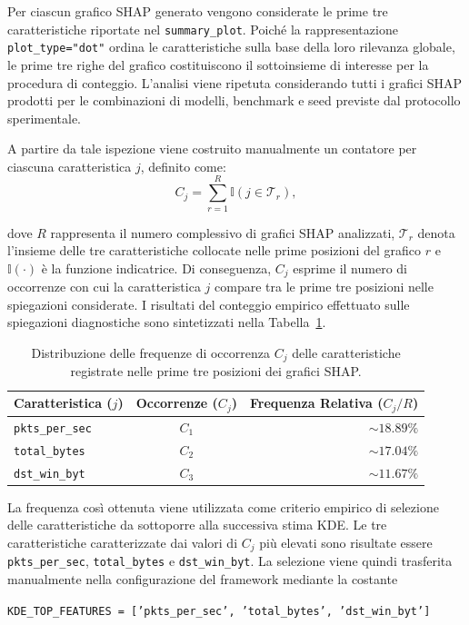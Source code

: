 Per ciascun grafico SHAP generato vengono considerate le prime tre caratteristiche riportate nel \texttt{summary\_plot}. 
Poiché la rappresentazione \texttt{plot\_type="dot"} ordina le caratteristiche sulla base della loro rilevanza globale, le prime tre righe del grafico costituiscono il sottoinsieme di interesse per la procedura di conteggio. 
L'analisi viene ripetuta considerando tutti i grafici SHAP prodotti per le combinazioni di modelli, benchmark e seed previste dal protocollo sperimentale.

A partire da tale ispezione viene costruito manualmente un contatore per ciascuna caratteristica $j$, definito come:
\begin{equation}
C_j =
\sum_{r=1}^{R}
\mathbb{I}\left(j \in \mathcal{T}_r\right),
\label{eq:shap_feature_counter}
\end{equation}

dove $R$ rappresenta il numero complessivo di grafici SHAP analizzati, $\mathcal{T}_r$ denota l'insieme delle tre caratteristiche collocate nelle prime posizioni del grafico $r$ e $\mathbb{I}(\cdot)$ è la funzione indicatrice. 
Di conseguenza, $C_j$ esprime il numero di occorrenze con cui la caratteristica $j$ compare tra le prime tre posizioni nelle spiegazioni considerate.
I risultati del conteggio empirico effettuato sulle spiegazioni diagnostiche sono sintetizzati nella Tabella~\ref{tab:shap_feature_frequencies}. 

\begin{table}[H]
    \centering
    \small
    \caption{Distribuzione delle frequenze di occorrenza $C_j$ delle caratteristiche registrate nelle prime tre posizioni dei grafici SHAP.}
    \label{tab:shap_feature_frequencies}
    \begin{tabular}{l c r}
        \toprule
        \textbf{Caratteristica ($j$)} & \textbf{Occorrenze ($C_j$)} & \textbf{Frequenza Relativa ($C_j / R$)} \\
        \midrule
        \texttt{pkts\_per\_sec}   & $C_1$ & $\sim 18.89\%$ \\
        \texttt{total\_bytes}     & $C_2$ & $\sim 17.04\%$ \\
        \texttt{dst\_win\_byt}    & $C_3$ & $\sim 11.67\%$ \\
        \bottomrule
    \end{tabular}
\end{table}

La frequenza così ottenuta viene utilizzata come criterio empirico di selezione delle caratteristiche da sottoporre alla successiva stima KDE. 
Le tre caratteristiche caratterizzate dai valori di $C_j$ più elevati sono risultate essere \texttt{pkts\_per\_sec}, \texttt{total\_bytes} e \texttt{dst\_win\_byt}. 
La selezione viene quindi trasferita manualmente nella configurazione del framework mediante la costante
\begin{center}
    \texttt{KDE\_TOP\_FEATURES = ['pkts\_per\_sec', 'total\_bytes', 'dst\_win\_byt']}    
\end{center}

